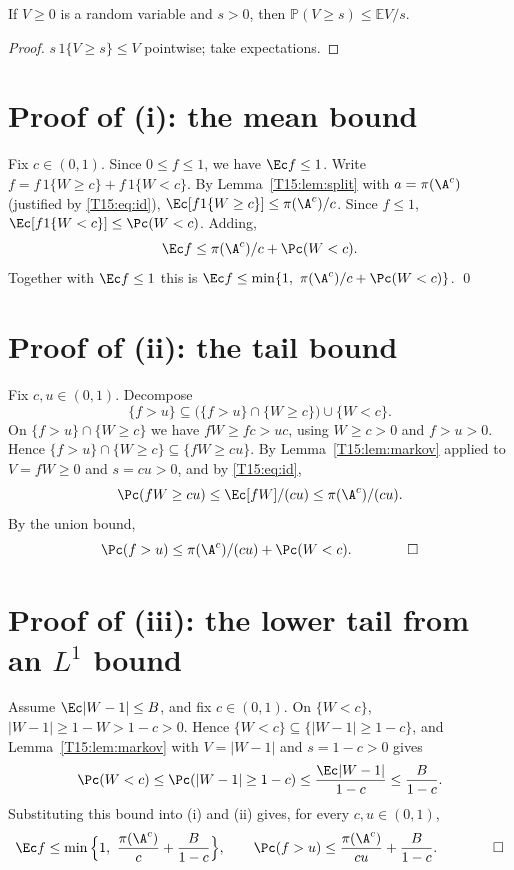 \documentclass[11pt]{report}
\begin{document}
\begin{T15lemma}[Markov]\label{T15:lem:markov}
If $V\ge0$ is a random variable and $s>0$, then $\mathbb P(V\ge s)\le \mathbb E V/s$.
\end{T15lemma}
\begin{proof}
$s\,1\{V\ge s\}\le V$ pointwise; take expectations.
\end{proof}

\section{Proof of (i): the mean bound}

Fix $c\in(0,1)$. Since $0\le f\le1$, we have $\Ec f\le1$. Write $f=f\,1\{W\ge c\}+f\,1\{W<c\}$. By
Lemma~\ref{T15:lem:split} with $a=\pi(\A^c)$ (justified by \eqref{T15:eq:id}), $\Ec[f1\{W\ge c\}]\le\pi(\A^c)/c$. Since
$f\le1$, $\Ec[f1\{W<c\}]\le\Pc(W<c)$. Adding,
\[
  \Ec f\le \pi(\A^c)/c+\Pc(W<c).
\]
Together with $\Ec f\le1$ this is $\Ec f\le\min\{1,\ \pi(\A^c)/c+\Pc(W<c)\}$. \qed

\section{Proof of (ii): the tail bound}

Fix $c,u\in(0,1)$. Decompose
\[
  \{f>u\}\subseteq\big(\{f>u\}\cap\{W\ge c\}\big)\cup\{W<c\}.
\]
On $\{f>u\}\cap\{W\ge c\}$ we have $fW\ge fc>uc$, using $W\ge c>0$ and $f>u>0$. Hence
$\{f>u\}\cap\{W\ge c\}\subseteq\{fW\ge cu\}$. By Lemma~\ref{T15:lem:markov} applied to $V=fW\ge0$ and $s=cu>0$, and by
\eqref{T15:eq:id},
\[
  \Pc(fW\ge cu)\le \Ec[fW]/(cu)\le\pi(\A^c)/(cu).
\]
By the union bound,
\[
  \Pc(f>u)\le\pi(\A^c)/(cu)+\Pc(W<c). \qquad\qed
\]

\section{Proof of (iii): the lower tail from an $L^1$ bound}

Assume $\Ec|W-1|\le B$, and fix $c\in(0,1)$. On $\{W<c\}$, $|W-1|\ge 1-W>1-c>0$. Hence
$\{W<c\}\subseteq\{|W-1|\ge 1-c\}$, and Lemma~\ref{T15:lem:markov} with $V=|W-1|$ and $s=1-c>0$ gives
\[
  \Pc(W<c)\le\Pc(|W-1|\ge1-c)\le\frac{\Ec|W-1|}{1-c}\le\frac{B}{1-c}.
\]
Substituting this bound into (i) and (ii) gives, for every $c,u\in(0,1)$,
\[
  \Ec f\le\min\Big\{1,\ \frac{\pi(\A^c)}{c}+\frac{B}{1-c}\Big\},\qquad
  \Pc(f>u)\le\frac{\pi(\A^c)}{cu}+\frac{B}{1-c}. \qquad\qed
\]
\end{document}
